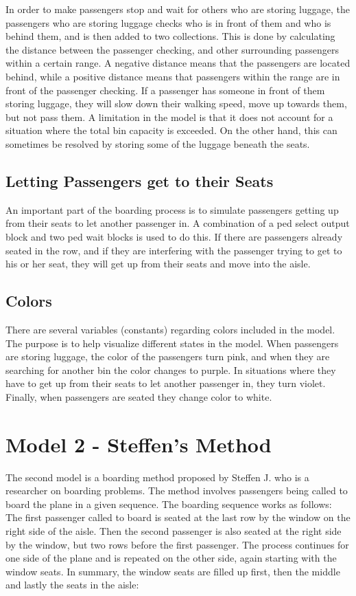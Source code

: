 \indent\newline
In order to make passengers stop and wait for others who are storing luggage, the passengers who are storing luggage checks who is in front of them and who is behind them, and is then added to two collections. This is done by calculating the distance between the passenger checking, and other surrounding passengers within a certain range. A negative distance means that the passengers are located behind, while a positive distance means that passengers within the range are in front of the passenger checking. If a passenger has someone in front of them storing luggage, they will slow down their walking speed, move up towards them, but not pass them. A limitation in the model is that it does not account for a situation where the total bin capacity is exceeded. On the other hand, this can sometimes be resolved by storing some of the luggage beneath the seats.   

\subsection{Letting Passengers get to their Seats}
An important part of the boarding process is to simulate passengers getting up from their seats to let another passenger in. A combination of a ped select output block and two ped wait blocks is used to do this. If there are passengers already seated in the row, and if they are interfering with the passenger trying to get to his or her seat, they will get up from their seats and move into the aisle.  

\subsection{Colors}
There are several variables (constants) regarding colors included in the model. The purpose is to help visualize different states in the model. When passengers are storing luggage, the color of the passengers turn pink, and when they are searching for another bin the color changes to purple. In situations where they have to get up from their seats to let another passenger in, they turn violet. Finally, when passengers are seated they change color to white.    

\section{Model 2 - Steffen's Method}
The second model is a boarding method proposed by Steffen J. who is a researcher on boarding problems. The method involves passengers being called to board the plane in a given sequence. The boarding sequence works as follows: The first passenger called to board is seated at the last row by the window on the right side of the aisle. Then the second passenger is also seated at the right side by the window, but two rows before the first passenger. The process continues for one side of the plane and is repeated on the other side, again starting with the window seats. In summary, the window seats are filled up first, then the middle and lastly the seats in the aisle:


